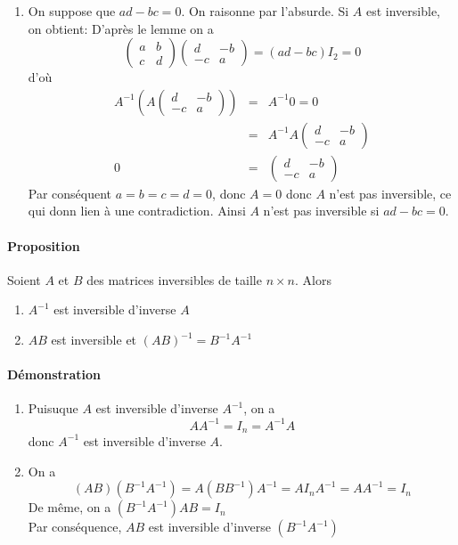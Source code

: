 \begin{enumerate}
  \item On suppose que $a d - b c = 0$. On raisonne par l'absurde. Si $A$ est inversible, on obtient: D'après le lemme on a
    $$\begin{pmatrix} a & b \\ c & d \end{pmatrix} \begin{pmatrix} d & -b \\ -c & a \end{pmatrix} = (a d - b c) I_2 = 0$$
    d'où
    \begin{eqnarray*}
      A^{-1} \left( A \begin{pmatrix} d & -b \\ -c & a \end{pmatrix} \right) &=& A^{-1} 0 = 0 \\
        &=& A^{-1} A \begin{pmatrix} d & -b \\ -c & a \end{pmatrix} \\
      0 &=& \begin{pmatrix} d & -b \\ -c & a \end{pmatrix}
    \end{eqnarray*}
    Par conséquent $a = b = c = d = 0$, donc $A = 0$ donc $A$ n'est pas inversible, ce qui donn lien à une contradiction. Ainsi $A$ n'est pas inversible si $a d - b c = 0$.
    
\end{enumerate}

\paragraph{Proposition} Soient $A$ et $B$ des matrices inversibles de taille $n \times n$. Alors
\begin{enumerate}
  \item $A^{-1}$ est inversible d'inverse $A$
  \item $A B$ est inversible et $(A B)^{-1} = B^{-1} A^{-1}$
\end{enumerate}

\paragraph{Démonstration}
\begin{enumerate}
  \item Puisuque $A$ est inversible d'inverse $A^{-1}$, on a
    $$A A^{-1} = I_n = A^{-1} A$$
    donc $A^{-1}$ est inversible d'inverse $A$.
  \item On a
    $$(A B)(B^{-1} A^{-1}) = A (B B^{-1}) A^{-1} = A I_n A^{-1} = A A^{-1} = I_n$$
    De même, on a $(B^{-1} A^{-1}) A B = I_n$ \\
    Par conséquence, $A B$ est inversible d'inverse $(B^{-1} A^{-1})$
\end{enumerate}


